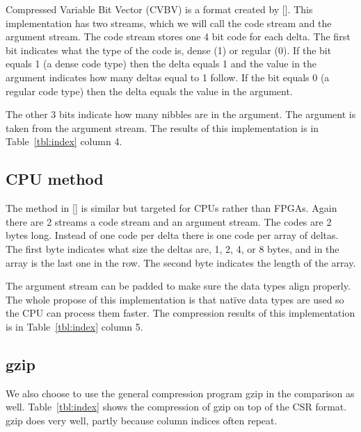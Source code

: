 Compressed Variable Bit Vector (CVBV) is a format created by [\cite{prelim:kestur}]. This implementation has two streams, which we will call the code stream and the argument stream. The code stream stores one 4 bit code for each delta. The first bit indicates what the type of the code is, dense (1) or regular (0). If the bit equals 1 (a dense code type) then the delta equals 1 and the value in the argument indicates how many deltas equal to 1 follow. If the bit equals 0 (a regular code type) then the delta equals the value in the argument.

The other 3 bits indicate how many nibbles are in the argument. The argument is taken from the argument stream. The results of this implementation is in Table~\ref{tbl:index} column 4.
\subsection{CPU method}

The method in [\cite{prelim:kourtis}] is similar but targeted for CPUs rather than FPGAs. Again there are 2 streams a code stream and an argument stream. The codes are 2 bytes long. Instead of one code per delta there is one code per array of deltas. The first byte indicates what size the deltas are, 1, 2, 4, or 8 bytes, and in the array is the last one in the row. The second byte indicates the length of the array.

The argument stream can be padded to make sure the data types align properly. The whole propose of this implementation is that nat\"ive data types are used so the CPU can process them faster. The compression results of this implementation is in Table~\ref{tbl:index} column 5.

\subsection{gzip}
We also choose to use the general compression program gzip in the comparison as well. Table~\ref{tbl:index} shows the compression of gzip on top of the CSR format. gzip does very well, partly because column indices often repeat.


